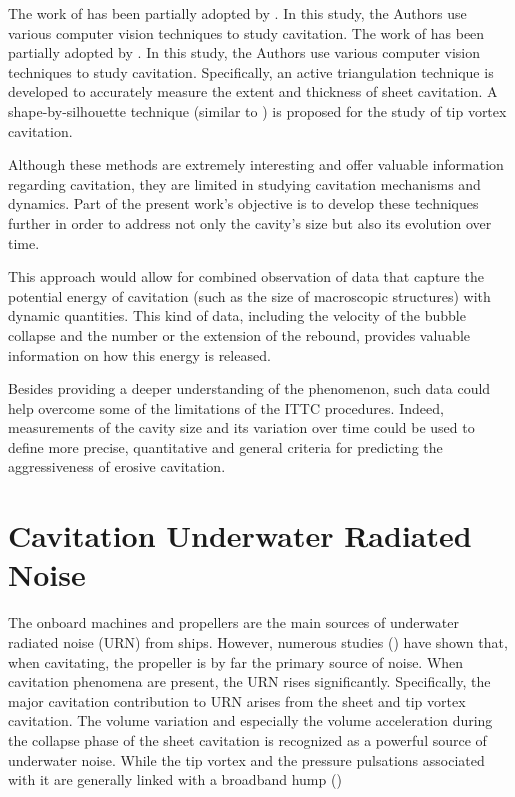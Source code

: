 The work of \cite{Pereira1998} has been partially adopted by \cite{Savio2011}. In this study, the Authors use various computer vision techniques to study cavitation. The work of \cite{Pereira1998} has been partially adopted by \cite{Savio2011}. In this study, the Authors use various computer vision techniques to study cavitation. Specifically, an active triangulation technique is developed to accurately measure the extent and thickness of sheet cavitation. A shape-by-silhouette technique (similar to  \cite{Pereira1998}) is proposed for the study of tip vortex cavitation.

Although these methods are extremely interesting and offer valuable information regarding cavitation, they are limited in studying cavitation mechanisms and dynamics.
Part of the present work's objective is to develop these techniques further in order to address not only the cavity's size but also its evolution over time.

This approach would allow for combined observation of data that capture the potential energy of cavitation (such as the size of macroscopic structures) with dynamic quantities.  This kind of data, including the velocity of the bubble collapse and the number or the extension of the rebound, provides valuable information on how this energy is released.

Besides providing a deeper understanding of the phenomenon, such data could help overcome some of the limitations of the ITTC procedures. Indeed, measurements of the cavity size and its variation over time could be used to define more precise, quantitative and general criteria for predicting the aggressiveness of erosive cavitation.

\section{Cavitation Underwater Radiated Noise}

The onboard machines and propellers are the main sources of underwater radiated noise (URN) from ships. However, numerous studies (\cite{Ross2013}) have shown that, when cavitating, the propeller is by far the primary source of noise. When cavitation phenomena are present, the URN rises significantly. Specifically, the major cavitation contribution to URN arises from the sheet and tip vortex cavitation.
The volume variation and especially the volume acceleration during the collapse phase of the sheet cavitation is recognized as a powerful source of underwater noise. While the tip vortex and the pressure pulsations associated with it are generally linked with a broadband hump (\cite{Lloyd2020})

